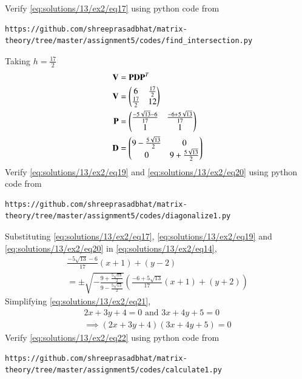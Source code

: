 Verify  \eqref{eq:solutions/13/ex2/eq17} using python code from
\begin{lstlisting}
https://github.com/shreeprasadbhat/matrix-theory/tree/master/assignment5/codes/find_intersection.py
\end{lstlisting}
{Taking $h=\frac{17}{2}$}
\begin{align}
	\mathbf{V} &= \mathbf{P}\mathbf{D}\mathbf{P}^T\\
	\label{eq:solutions/13/ex2/eq18}\mathbf{V} &= \begin{pmatrix} 6 & \frac{17}{2}\\ \frac{17}{2} & 12\end{pmatrix}\\
	\label{eq:solutions/13/ex2/eq19}\mathbf{P} &= \begin{pmatrix}\frac{-5\sqrt{13} - 6}{17} & \frac{-6 + 5\sqrt{13}}{17}\\ 1 & 1\end{pmatrix}\\
	\label{eq:solutions/13/ex2/eq20}\mathbf{D} &= \begin{pmatrix}9 - \frac{5\sqrt{13}}{2} & 0\\ 0 & 9 + \frac{5\sqrt{13}}{2}\end{pmatrix}
\end{align}
Verify  \eqref{eq:solutions/13/ex2/eq19} and \eqref{eq:solutions/13/ex2/eq20} using python code from
\begin{lstlisting}
https://github.com/shreeprasadbhat/matrix-theory/tree/master/assignment5/codes/diagonalize1.py
\end{lstlisting}
Substituting \eqref{eq:solutions/13/ex2/eq17}, \eqref{eq:solutions/13/ex2/eq19} and \eqref{eq:solutions/13/ex2/eq20} in \eqref{eq:solutions/13/ex2/eq14},
\begin{multline}\label{eq:solutions/13/ex2/eq21}
	\frac{-5\sqrt{13} - 6}{17}(x+1) + (y-2) \\= \pm \sqrt{-\frac{9 + \frac{5\sqrt{13}}{2}}{9 - \frac{5\sqrt{13}}{2}}}\left(\frac{-6 + 5\sqrt{13}}{17}(x+1) + (y+2)\right)
\end{multline}
Simplifying \eqref{eq:solutions/13/ex2/eq21},
\begin{align}
	\label{eq:solutions/13/ex2/eq22}2x + 3y + 4 = 0 \text{ and } 3x + 4y + 5 = 0\\
	\implies (2x + 3y + 4)(3x + 4y + 5) = 0
\end{align}
Verify  \eqref{eq:solutions/13/ex2/eq22} using python code from
\begin{lstlisting}
https://github.com/shreeprasadbhat/matrix-theory/tree/master/assignment5/codes/calculate1.py
\end{lstlisting}

